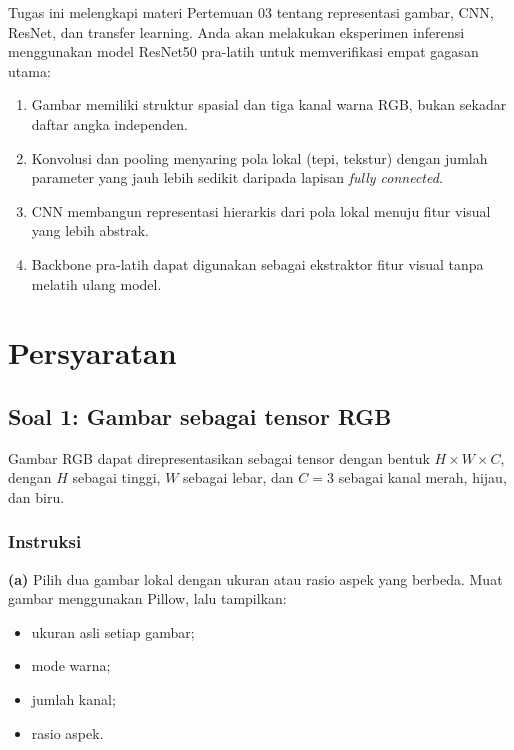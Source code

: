 \documentclass[12pt, a4paper]{article}
\begin{document}
Tugas ini melengkapi materi Pertemuan 03 tentang representasi gambar, CNN, ResNet, dan transfer learning. Anda akan melakukan eksperimen inferensi menggunakan model ResNet50 pra-latih untuk memverifikasi empat gagasan utama:
\begin{enumerate}
  \item Gambar memiliki struktur spasial dan tiga kanal warna RGB, bukan sekadar daftar angka independen.
  \item Konvolusi dan pooling menyaring pola lokal (tepi, tekstur) dengan jumlah parameter yang jauh lebih sedikit daripada lapisan \emph{fully connected}.
  \item CNN membangun representasi hierarkis dari pola lokal menuju fitur visual yang lebih abstrak.
  \item Backbone pra-latih dapat digunakan sebagai ekstraktor fitur visual tanpa melatih ulang model.
\end{enumerate}

\section{Persyaratan}\label{sec:requirements}

\subsection{Soal 1: Gambar sebagai tensor RGB}
\label{sec:soal1}

Gambar RGB dapat direpresentasikan sebagai tensor dengan bentuk $H \times W \times C$, dengan $H$ sebagai tinggi, $W$ sebagai lebar, dan $C=3$ sebagai kanal merah, hijau, dan biru.

\subsubsection{Instruksi}
\label{sec:soal1-instruksi}

\textbf{(a)} Pilih dua gambar lokal dengan ukuran atau rasio aspek yang berbeda. Muat gambar menggunakan Pillow, lalu tampilkan:
\begin{itemize}
  \item ukuran asli setiap gambar;
  \item mode warna;
  \item jumlah kanal;
  \item rasio aspek.
\end{itemize}
\end{document}

